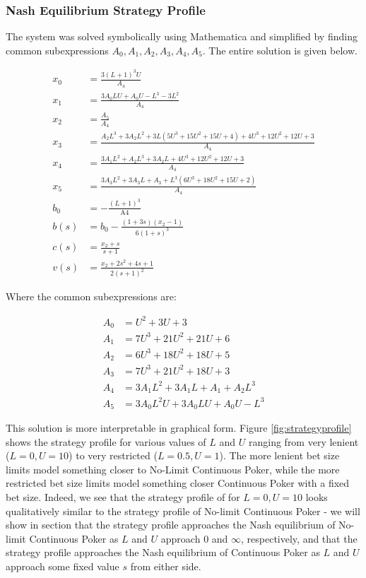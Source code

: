 \documentclass[a4paper,12pt]{article}
\theoremstyle{plain}
\theoremstyle{definition}
\begin{document}
\subsubsection{Nash Equilibrium Strategy Profile}

The system was solved symbolically using Mathematica and simplified by finding common subexpressions $A_0, A_1, A_2, A_3, A_4, A_5$. The entire solution is given below.

\begin{align*}
    x_0 &= \frac{3 (L+1)^3 U}{A_4}\\
    x_1 &= \frac{3 A_0 L U+A_0 U-L^3-3 L^2}{A_4}\\
    x_2 &= \frac{A_5}{A_4}\\
    x_3 &= \frac{A_2 L^3+3 A_2 L^2+3 L \left(5 U^3+15 U^2+15 U+4\right)+4 U^3+12 U^2+12 U+3}{A_4}\\
    x_4 &= \frac{3 A_1 L^2+A_2 L^3+3 A_2 L+4 U^3+12 U^2+12 U+3}{A_4}\\
    x_5 &= \frac{3 A_3 L^2+3 A_3 L+A_3+L^3 \left(6 U^3+18 U^2+15 U+2\right)}{A_4}\\
    b_0 &= -\frac{(L+1)^3}{\text{A4}} \\ 
    b(s) &= b_0 - \frac{(1+3s)(x_2-1)}{6(1+s)^3}\\
    c(s) &= \frac{x_2+s}{s+1}\\
    v(s) &= \frac{x_2+2 s^2+4 s+1}{2 (s+1)^2}
\end{align*}


Where the common subexpressions are:

\begin{align*}
	A_0 &= U^2+3 U+3 \\
    A_1 &= 7 U^3+21 U^2+21 U+6 \\
    A_2 &= 6 U^3+18 U^2+18 U+5 \\
    A_3 &= 7 U^3+21 U^2+18 U+3 \\
    A_4 &= 3 A_1 L^2+3 A_1 L+A_1+A_2 L^3 \\
    A_5 &= 3 A_0 L^2 U+3 A_0 L U+A_0 U-L^3
\end{align*}

This solution is more interpretable in graphical form. Figure \ref{fig:strategyprofile} shows the strategy profile for various values of $L$ and $U$ ranging from very lenient ($L=0, U=10$) to very restricted ($L=0.5, U=1$). The more lenient bet size limits model something closer to No-Limit Continuous Poker, while the more restricted bet size limits model something closer Continuous Poker with a fixed bet size. Indeed, we see that the strategy profile of for $L=0, U=10$ looks qualitatively similar to the strategy profile of No-limit Continuous Poker - we will show in section  that the strategy profile approaches the Nash equilibrium of No-limit Continuous Poker as $L$ and $U$ approach $0$ and $\infty$, respectively, and that the strategy profile approaches the Nash equilibrium of Continuous Poker as $L$ and $U$ approach some fixed value $s$ from either side.
\end{document}
